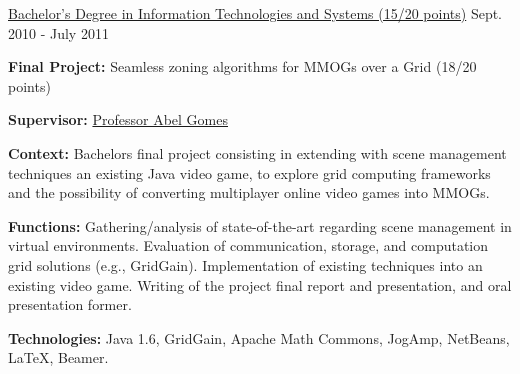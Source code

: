 \begin{cventries}
  \cventry
    {\href{https://www.ubi.pt/en/course/64}{Bachelor's Degree in Information Technologies and Systems (15/20 points)}} %
    {} %
    {} %
    {Sept. 2010 - July 2011} %
    {
      \begin{cvitems} %
        \item {\textbf{Final Project:} Seamless zoning algorithms for MMOGs over a Grid (18/20 points)}
		\item {\textbf{Supervisor:} \href{http://www.di.ubi.pt/~agomes/}{Professor Abel Gomes}}
		\item {\textbf{Context:} Bachelors final project consisting in extending with scene management techniques an existing Java video game, to explore grid computing frameworks and the possibility of converting multiplayer online video games into MMOGs.}
		\item {\textbf{Functions:} Gathering/analysis of state-of-the-art regarding scene management in virtual environments. Evaluation of communication, storage, and computation grid solutions (e.g., GridGain). Implementation of existing techniques into an existing video game. Writing of the project final report and presentation, and oral presentation former.}
		\item {\textbf{Technologies:} Java 1.6, GridGain, Apache Math Commons, JogAmp, NetBeans, LaTeX, Beamer.} %
      \end{cvitems}
    }
  

\end{cventries}
